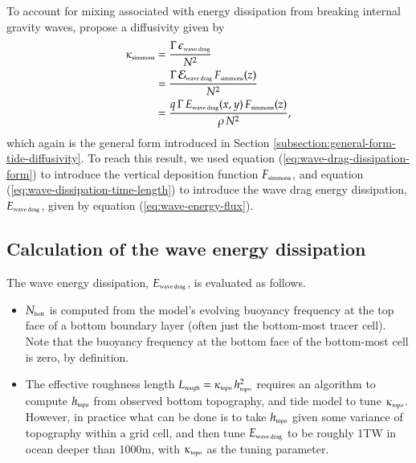To account for mixing associated with energy dissipation from breaking
internal gravity waves, \cite{Simmonsetal2004} propose a diffusivity
given by
\begin{subequations}
\begin{align}
 \kappa_{\mbox{\tiny simmons}} &= 
 \frac{\Gamma \, \epsilon_{\mbox{\tiny wave drag}}}{N^{2}}
\\
 &= \frac{\Gamma \, {\cal E}_{\mbox{\tiny wave drag}} \, F_{\mbox{\tiny simmons}}(z)}{N^{2}}
\\
 &=
 \frac{q \, \Gamma \, E_{\mbox{\tiny wave drag}}(x,y) \,  F_{\mbox{\tiny simmons}}(z) }  {\rho \, N^2},
\end{align}
\label{eq:wave-vert-kappa-simmons}
\end{subequations}
which again is the general form introduced in Section
\ref{subsection:general-form-tide-diffusivity}.  To reach this result,
we used equation (\ref{eq:wave-drag-dissipation-form}) to introduce
the vertical deposition function $F_{\mbox{\tiny simmons}}$, and
equation (\ref{eq:wave-dissipation-time-length}) to introduce the wave
drag energy dissipation, $E_{\mbox{\tiny wave drag}}$, given by
equation (\ref{eq:wave-energy-flux}).


\subsection{Calculation of the wave energy dissipation} 
\label{subsection:wave-drag-details-simmons}

The wave energy dissipation, $E_{\mbox{\tiny wave drag}}$, is
evaluated as follows.
\begin{itemize}

\item $N_{\mbox{\tiny bott}}$ is computed from the model's evolving
  buoyancy frequency at the top face of a bottom boundary layer (often
  just the bottom-most tracer cell).  Note that the buoyancy frequency
  at the bottom face of the bottom-most cell is zero, by definition.

\item The effective roughness length $L_{\mbox{\tiny rough}} =
  \kappa_{\mbox{\tiny topo}} \, h_{\mbox{\tiny topo}}^{2}$ requires an
  algorithm to compute $h_{\mbox{\tiny topo}}$ from observed bottom
  topography, and tide model to tune $\kappa_{\mbox{\tiny topo}}$.
  However, in practice what can be done is to take $h_{\mbox{\tiny
      topo}}$ given some variance of topography within a grid cell,
  and then tune $E_{\mbox{\tiny wave drag}}$ to be roughly 1TW in
  ocean deeper than 1000m, with $\kappa_{\mbox{\tiny topo}}$ as the
  tuning parameter.

\end{itemize}


